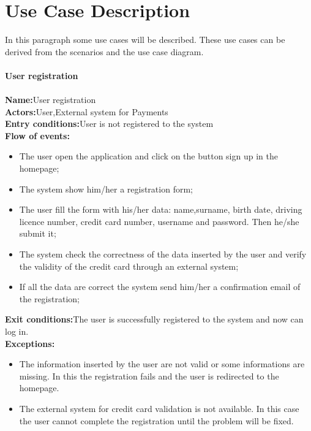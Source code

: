 \section{Use Case Description}
In this paragraph some use cases will be described. These use cases can be derived from the scenarios and the use case diagram.\\
\\
\textbf{User registration} \\
\\
\textbf{Name:}User registration \\
\textbf{Actors:}User,External system for Payments \\
\textbf{Entry conditions:}User is not registered to the system \\
\textbf{Flow of events:} \\
\begin{itemize}
\item The user open the application and click on the button sign up in the homepage;
\item The system show him/her a registration form;
\item The user fill the form with his/her data: name,surname, birth date, driving licence number, credit card number, username and password. Then he/she submit it;
\item The system check the correctness of the data inserted by the user and verify the validity of the credit card through an external system;
\item If all the data are correct the system send him/her a confirmation email of the registration;
\end{itemize}
\textbf{Exit conditions:}The user is successfully registered to the system and now can log in.\\
\textbf{Exceptions:}
\begin{itemize}
\item The information inserted by the user are not valid or some informations are missing.
In this the registration fails and the user is redirected to the homepage.
\item The external system for credit card validation is not available. In this case the user cannot complete the registration until the problem will be fixed.
\end{itemize}


